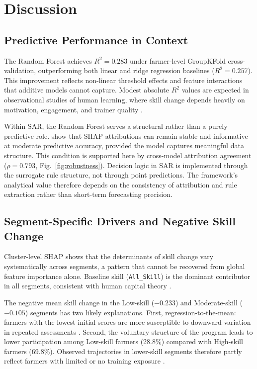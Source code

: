 \documentclass[3p,twocolumn,authoryear]{elsarticle}
\begin{document}
\section{Discussion}

\subsection{Predictive Performance in Context}

The Random Forest achieves $R^{2} = 0.283$ under farmer-level GroupKFold
cross-validation, outperforming both linear and ridge regression baselines
($R^{2} = 0.257$). This improvement reflects non-linear threshold effects and
feature interactions that additive models cannot capture. Modest absolute
$R^{2}$ values are expected in observational studies of human learning, where
skill change depends heavily on motivation, engagement, and trainer quality
\citep{davis2012}.

Within SAR, the Random Forest serves a structural rather than a purely
predictive role. \citet{lundberg2020} show that SHAP attributions can remain
stable and informative at moderate predictive accuracy, provided the model
captures meaningful data structure. This condition is supported here by
cross-model attribution agreement ($\rho = 0.793$,
Fig.~\ref{fig:robustness}). Decision logic in SAR is implemented through the
surrogate rule structure, not through point predictions. The framework’s
analytical value therefore depends on the consistency of attribution and rule
extraction rather than short-term forecasting precision.

\subsection{Segment-Specific Drivers and Negative Skill Change}

Cluster-level SHAP shows that the determinants of skill change vary
systematically across segments, a pattern that cannot be recovered from global
feature importance alone. Baseline skill (\texttt{All\_Skill}) is the dominant
contributor in all segments, consistent with human capital theory
\citep{feder1985,davis2012}.

The negative mean skill change in the Low-skill ($-0.233$) and Moderate-skill
($-0.105$) segments has two likely explanations. First, regression-to-the-mean:
farmers with the lowest initial scores are more susceptible to downward
variation in repeated assessments \citep{davis2012}. Second, the voluntary
structure of the program leads to lower participation among Low-skill farmers
(28.8\%) compared with High-skill farmers (69.8\%). Observed trajectories in
lower-skill segments therefore partly reflect farmers with limited or no
training exposure \citep{anderson2004}.
\end{document}
